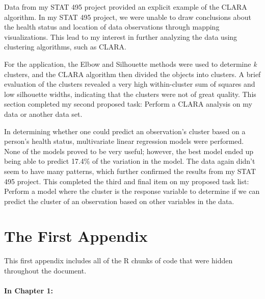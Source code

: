 \documentclass[12pt,twoside]{amherstthesis}
\begin{document}
  Data from my STAT 495 project provided an explicit example of the CLARA
  algorithm. In my STAT 495 project, we were unable to draw conclusions
  about the health status and location of data observations through
  mapping visualizations. This lead to my interest in further analyzing
  the data using clustering algorithms, such as CLARA.
  
  For the application, the Elbow and Silhouette methods were used to
  determine \emph{k} clusters, and the CLARA algorithm then divided the
  objects into clusters. A brief evaluation of the clusters revealed a
  very high within-cluster sum of squares and low silhouette widths,
  indicating that the clusters were not of great quality. This section
  completed my second proposed task: Perform a CLARA analysis on my data
  or another data set.
  
  In determining whether one could predict an observation's cluster based
  on a person's health status, multivariate linear regression models were
  performed. None of the models proved to be very useful; however, the
  best model ended up being able to predict 17.4\% of the variation in the
  model. The data again didn't seem to have many patterns, which further
  confirmed the results from my STAT 495 project. This completed the third
  and final item on my proposed task list: Perform a model where the
  cluster is the response variable to determine if we can predict the
  cluster of an observation based on other variables in the data.
  
  \appendix
  
  \singlespacing
  
  \chapter{The First Appendix}\label{the-first-appendix}
  
  This first appendix includes all of the R chunks of code that were
  hidden throughout the document.
  
  \subsubsection{In Chapter 1:}\label{in-chapter-1}
  
\end{document}
